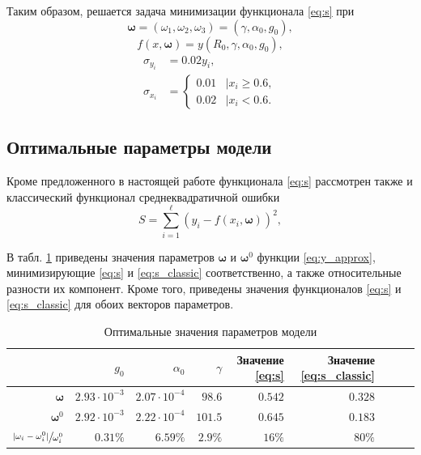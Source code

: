 \documentclass[tikz,10pt,a4paper]{article}
\newcommand{\bomega}{\boldsymbol{\omega}}
\begin{document}
Таким образом, решается задача минимизации функционала \eqref{eq:s} при
\[
  \bomega = (\omega_1, \omega_2, \omega_3) = (\gamma, \alpha_0, g_0),
\]
\[
  f(x, \bomega) = y(R_0, \gamma, \alpha_0, g_0),
\]
\begin{equation}
  \begin{array}{ll}
	\sigma_{y_i} &= 0.02 y_i,\\
	\sigma_{x_i} &= \left\{
	  \begin{array}{lr}
		0.01 & \mid x_i \geq 0.6, \\
		0.02 & \mid x_i < 0.6.
	  \end{array}
	\right.
  \end{array}
  \label{eq:sigmas_definition}
\end{equation}

\subsection{Оптимальные параметры модели}
Кроме предложенного в настоящей работе функционала \eqref{eq:s} рассмотрен
также и классический функционал среднеквадратичной ошибки
\begin{equation}
  S = \sum_{i = 1}^\ell (y_i - f(x_i, \bomega))^2,
  \label{eq:s_classic}
\end{equation}

В табл. \ref{tabl:res_coeffs} приведены значения параметров $\bomega$ и $\bomega^0$
функции \eqref{eq:y_approx},
минимизирующие \eqref{eq:s} и \eqref{eq:s_classic} соответственно, а также относительные
разности их компонент. Кроме того, приведены значения функционалов \eqref{eq:s} и
\eqref{eq:s_classic} для обоих векторов параметров.

\begin{table}[h]
  \caption{Оптимальные значения параметров модели}
  \centering
  \begin{tabular}{| r | r | r | r | r | r | r | r | r |}
	\hline
													& $g_0$					& $\alpha_0$			& $\gamma$				& Значение \eqref{eq:s} & Значение \eqref{eq:s_classic}	\\ \hline
	$\bomega$										& $2.93 \cdot 10^{-3}$	& $2.07 \cdot 10^{-4}$	& $98.6$				& $0.542$				& $0.328$						\\ \hline
	$\bomega^0$										& $2.92 \cdot 10^{-3}$	& $2.22 \cdot 10^{-4}$	& $101.5$				& $0.645$				& $0.183$						\\ \hline
	$\sfrac{|\omega_i - \omega^0_i|}{\omega^0_i}$	& $0.31 \%$				& $6.59 \%$				& $2.9 \%$				& $16 \%$				& $80 \%$						\\ \hline
  \end{tabular}
  \label{tabl:res_coeffs}
\end{table}
\end{document}
